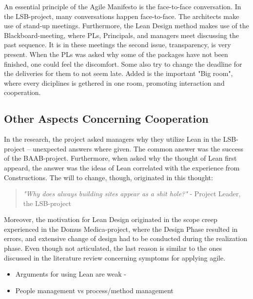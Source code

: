 An essential principle of the Agile Manifesto is the face-to-face conversation. In the LSB-project, many conversations happen face-to-face. The architects make use of stand-up meetings. Furthermore, the Lean Design method makes use of the Blackboard-meeting, where PLs, Principals, and managers meet discussing the past sequence. It is in these meetings the second issue, transparency, is very present. When the PLs was asked why some of the packages have not been finished, one could feel the discomfort. Some also try to change the deadline for the deliveries for them to not seem late. Added is the important "Big room", where every diciplines is gethered in one room, promoting interaction and cooperation. 

\subsection{Other Aspects Concerning Cooperation}
In the research, the project asked managers why they utilize Lean in the LSB-project – unexpected answers where given. The common answer was the success of the BAAB-project. Furthermore, when asked why the thought of Lean first appeard, the answer was the ideas of Lean correlated with the experience from Constructions. The will to change, though, originated in this thought: 
\begin{quote}
    \textit{"Why does always building sites appear as a shit hole?"} - Project Leader, the LSB-project
\end{quote}
Moreover, the motivation for Lean Design originated in the scope creep experienced in the Domus Medica-project, where the Design Phase resulted in errors, and extensive change of design had to be conducted during the realization phase. Even though not articulated, the last reason is similar to the ones discussed in the literature review concerning symptoms for applying agile.

\begin{itemize}
    \item Arguments for using Lean are weak - 
    \item People management vs process/method management
\end{itemize}



%
%
%
\cleardoublepage